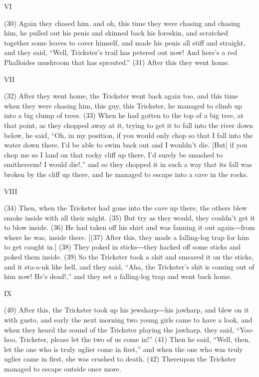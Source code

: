 \begin{center}
VI
\end{center}

\leftskip=0pt
(30) Again they chased him, and oh, this time they were chasing and chasing him,
he pulled out his penis and skinned back his foreskin, and scratched together some
leaves to cover himself, and made his penis all stiff and straight, and they said,
``Well, Trickster's trail has petered out now! And here's a red Phalloides mushroom
that has sprouted.'' (31) After this they went home.

\begin{center}
VII
\end{center}

\leftskip=0pt
(32) After they went home, the Trickster went back again too, and this time when
they were chasing him, this guy, this Trickster, he managed to climb up into a
big clump of trees. (33) When he had gotten to the top of a big tree, at that point,
as they chopped away at it, trying to get it to fall into the river down below,
he said, ``Oh, in my position, if you would only chop so that I fall into the water
down there, I'd be able to swim back out and I wouldn't die. [But] if you chop
me so I land on that rocky cliff up there, I'd surely be smashed to smithereens!
I would die!,'' and so they chopped it in such a way that its fall was broken by
the cliff up there, and he managed to escape into a cave in the rocks.

\begin{center}
VIII
\end{center}

\leftskip=0pt
(34) Then, when the Trickster had gone into the cave up there, the others blew
smoke inside with all their might. (35) But try as they would, they couldn't get
it to blow inside. (36) He had taken off his shirt and was fanning it out again―from
where he was, inside there. [(37) After this, they made a falling-log trap for
him to get caught in.] (38) They poked in sticks―they hacked off some sticks
and poked them inside. (39) So the Trickster took a shit and smeared it on the
sticks, and it sta-a-nk like hell, and they said, ``Aha, the Trickster's shit is
coming out of him now! He's dead!,'' and they set a falling-log trap and went back
home.

\begin{center}
IX
\end{center}

\leftskip=0pt
(40) After this, the Trickster took up his jewsharp―his jawharp, and blew on
it with gusto, and early the next morning two young girls came to have a look,
and when they heard the sound of the Trickster playing the jawharp, they said,
``Yoo-hoo, Trickster, please let the two of us come in!'' (41) Then he said, ``Well,
then, let the one who is truly uglier come in first,'' and when the one who was
truly uglier came in first, she was crushed to death. (42) Thereupon the Trickster
managed to escape outside once more.

